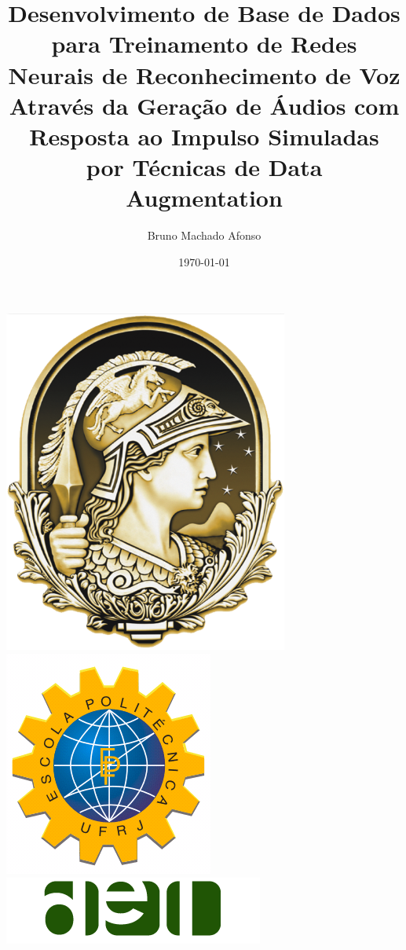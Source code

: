 \documentclass{libs/XJTLU_format}
\title[Defesa de Projeto de Graduação]{\normalsize\textbf{Desenvolvimento de Base de Dados para Treinamento de Redes Neurais de Reconhecimento de Voz
Através da Geração de Áudios com Resposta ao Impulso Simuladas por Técnicas de Data Augmentation}}
\author{Bruno Machado Afonso}
\institute[- Escola Politécnica]{
    \email{bruno.ma@poli.ufrj.br}
    \newline
    \department{\scriptsize Departamento de Engenharia Eletrônica e de Computação - Escola Politécnica}
    \newline
    \university{\scriptsize Universidade Federal do Rio de Janeiro}
}
\date{\today}
\begin{document}


\begin{frame}{}
    \includegraphics[scale=0.1]{figs/minerva-ufrj.png} \hspace{3cm} \vspace{-0.2cm}
    \includegraphics[scale=0.15]{figs/poli.png} \hspace{2cm} \vspace{-0.2cm}
    \includegraphics[scale=0.25]{figs/del.png} \hspace{-0.1cm} \vspace{-0.1cm}
    \maketitle
\end{frame} 
\end{document}
